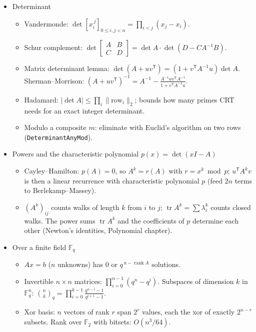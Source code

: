 \begin{itemize}
\item Determinant
\begin{itemize}
  \item Vandermonde: $\det [x_i^{\,j}]_{0 \le i, j < n} = \prod_{i < j} (x_j - x_i)$.
  \item Schur complement: $\det \begin{bmatrix} A & B \\ C & D \end{bmatrix} = \det A \cdot \det(D - CA^{-1}B)$.
  \item Matrix determinant lemma: $\det(A + uv^\mathsf{T}) = (1 + v^\mathsf{T}A^{-1}u) \det A$. Sherman–Morrison: $(A + uv^\mathsf{T})^{-1} = A^{-1} - \frac{A^{-1}uv^\mathsf{T}A^{-1}}{1 + v^\mathsf{T}A^{-1}u}$.
  \item Hadamard: $|\det A| \le \prod_i \lVert \text{row}_i \rVert_2$; bounds how many primes CRT needs for an exact integer determinant.
  \item Modulo a composite $m$: eliminate with Euclid's algorithm on two rows (\texttt{DeterminantAnyMod}).
\end{itemize}

\item Powers and the characteristic polynomial $p(x) = \det(xI - A)$
\begin{itemize}
  \item Cayley–Hamilton: $p(A) = 0$, so $A^k = r(A)$ with $r = x^k \bmod p$; $u^\mathsf{T} A^k v$ is then a linear recurrence with characteristic polynomial $p$ (feed $2n$ terms to Berlekamp–Massey).
  \item $(A^k)_{ij}$ counts walks of length $k$ from $i$ to $j$; $\operatorname{tr} A^k = \sum \lambda_i^k$ counts closed walks. The power sums $\operatorname{tr} A^k$ and the coefficients of $p$ determine each other (Newton's identities, Polynomial chapter).
\end{itemize}

\item Over a finite field $\mathbb{F}_q$
\begin{itemize}
  \item $Ax = b$ ($n$ unknowns) has $0$ or $q^{\,n - \operatorname{rank} A}$ solutions.
  \item Invertible $n \times n$ matrices: $\prod_{i=0}^{n-1} (q^n - q^i)$. Subspaces of dimension $k$ in $\mathbb{F}_q^n$: $\binom{n}{k}_q = \prod_{i=0}^{k-1} \frac{q^{n-i} - 1}{q^{i+1} - 1}$.
  \item Xor basis: $n$ vectors of rank $r$ span $2^r$ values, each the xor of exactly $2^{n-r}$ subsets. Rank over $\mathbb{F}_2$ with bitsets: $O(n^3 / 64)$.
\end{itemize}


\end{itemize}
